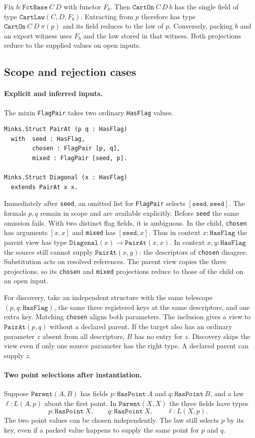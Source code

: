 \documentclass{article}
\newcommand{\ttt}[1]{\texttt{#1}}
\begin{document}
Fix $b:\ttt{FctBase}\ C\ D$ with functor $F_b$.
Then $\ttt{CartOn}\ C\ D\ b$ has the single field of type
$\ttt{CartLaw}(C,D,F_b)$. Extracting from $p$ therefore has type
$\ttt{CartOn}\ C\ D\ \pi(p)$ and its field reduces to the law of $p$.
Conversely, packing $b$ and an export witness uses $F_b$ and the law
stored in that witness. Both projections reduce to the supplied values on open inputs.

\subsection{Scope and rejection cases}
\paragraph{Explicit and inferred inputs.}
The mixin \ttt{FlagPair} takes two ordinary \ttt{HasFlag} values.
\begin{verbatim}
Minks.Struct PairAt (p q : HasFlag)
  with  seed : HasFlag,
        chosen : FlagPair [p, q],
        mixed : FlagPair [seed, p].

Minks.Struct Diagonal (x : HasFlag)
  extends PairAt x x.
\end{verbatim}
Immediately after \ttt{seed}, an omitted list for \ttt{FlagPair}
selects $[\ttt{seed},\ttt{seed}]$. The formals $p,q$ remain in scope
and are available explicitly. Before \ttt{seed} the same omission fails.
With two distinct flag fields, it is ambiguous. In the child,
\ttt{chosen} has arguments $[x,x]$ and \ttt{mixed} has
$[\ttt{seed},x]$. Thus in context $x:\ttt{HasFlag}$ the parent view has
type $\ttt{Diagonal}(x)\to\ttt{PairAt}(x,x)$. In context
$x,y:\ttt{HasFlag}$ the source still cannot supply
$\ttt{PairAt}(x,y)$: the descriptors of \ttt{chosen} disagree.
Substitution acts on resolved references. The parent view copies the three projections, so its \ttt{chosen}
and \ttt{mixed} projections reduce to those of the child on an open input.

For discovery, take an independent structure with the same telescope
$(p,q:\ttt{HasFlag})$, the same three registered keys at the same
descriptors, and one extra key. Matching \ttt{chosen} aligns both
parameters. The inclusion gives a view to $\ttt{PairAt}(p,q)$ without
a declared parent. If the target also
has an ordinary parameter $z$ absent from all descriptors, $B$ has
no entry for $z$. Discovery skips the view even if only one source
parameter has the right type. A declared parent can supply $z$.

\paragraph{Two point selections after instantiation.}
Suppose $\ttt{Parent}(A,B)$ has fields $p:\ttt{HasPoint}\ A$ and
$q:\ttt{HasPoint}\ B$, and a law $\ell:L(A,p)$ about the first point.
In $\ttt{Parent}(X,X)$ the three fields have types
\[
  p:\ttt{HasPoint}\ X,\qquad q:\ttt{HasPoint}\ X,\qquad \ell:L(X,p).
\]
The two point values can be chosen independently. The law still selects
$p$ by its key, even if a packed value happens to supply the same point
for $p$ and $q$.
\end{document}
